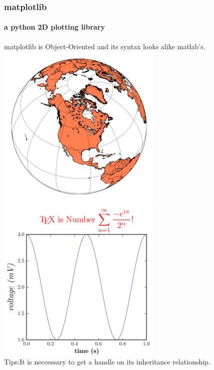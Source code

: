 \documentclass[compress=true]{beamer}
\begin{document}
\begin{frame}
	\frametitle{matplotlib}
	\framesubtitle {a python 2D plotting library}
	matplotlib is Object-Oriented and its syntax looks alike matlab's.\\
	\includegraphics[height=0.5\textheight]{matplotlib_2.png}
	\includegraphics[height=0.5\textheight]{matplotlib_1.png}\\
	Tips:It is neccessary to get a handle on its inheritance relationship.
\end{frame}
\end{document}

